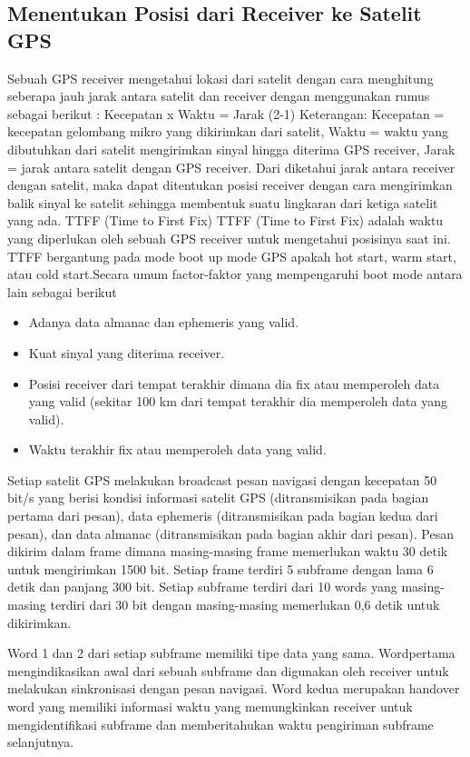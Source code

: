 \subsection{Menentukan Posisi dari Receiver ke Satelit GPS  }
Sebuah GPS receiver mengetahui lokasi dari satelit dengan cara menghitung seberapa jauh jarak antara satelit dan receiver dengan menggunakan rumus sebagai berikut :
Kecepatan x Waktu = Jarak (2-1)
Keterangan: 
Kecepatan = kecepatan gelombang mikro yang dikirimkan dari satelit, 
Waktu = waktu yang dibutuhkan dari satelit mengirimkan sinyal hingga diterima GPS receiver, 
Jarak = jarak antara satelit dengan GPS receiver. 
Dari diketahui jarak antara receiver dengan satelit, maka dapat ditentukan posisi receiver dengan cara mengirimkan balik sinyal ke satelit sehingga membentuk suatu lingkaran dari ketiga satelit yang ada.
TTFF (Time to First Fix) 
TTFF (Time to First Fix) adalah waktu yang diperlukan oleh sebuah GPS receiver untuk mengetahui posisinya saat ini. TTFF bergantung pada mode boot up mode GPS apakah hot start, warm start, atau cold start.Secara umum factor-faktor yang mempengaruhi boot mode antara lain sebagai berikut
\begin{itemize}
	\item Adanya data almanac dan ephemeris yang valid.
	\item  Kuat sinyal yang diterima receiver. 
	\item Posisi receiver dari tempat terakhir dimana dia fix atau memperoleh data yang valid (sekitar 100 km dari tempat terakhir dia memperoleh data yang valid).
	\item Waktu terakhir fix atau memperoleh data yang valid.
\end{itemize}

Setiap satelit GPS melakukan broadcast pesan navigasi dengan kecepatan 50 bit/s yang berisi kondisi informasi satelit GPS (ditransmisikan pada bagian pertama dari pesan), data ephemeris (ditransmisikan pada bagian kedua dari pesan), dan data almanac (ditransmisikan pada bagian akhir dari pesan). Pesan dikirim dalam frame dimana masing-masing frame memerlukan waktu 30 detik untuk mengirimkan 1500 bit. Setiap frame terdiri 5 subframe dengan lama 6 detik dan panjang 300 bit. Setiap subframe terdiri dari 10 words yang masing-masing terdiri dari 30 bit dengan masing-masing memerlukan 0,6 detik untuk dikirimkan.

Word 1 dan 2 dari setiap subframe memiliki tipe data yang sama. Wordpertama mengindikasikan awal dari sebuah subframe dan digunakan oleh receiver untuk melakukan sinkronisasi dengan pesan navigasi. Word kedua merupakan handover word yang memiliki informasi waktu yang memungkinkan receiver untuk mengidentifikasi subframe dan memberitahukan waktu pengiriman subframe selanjutnya.

